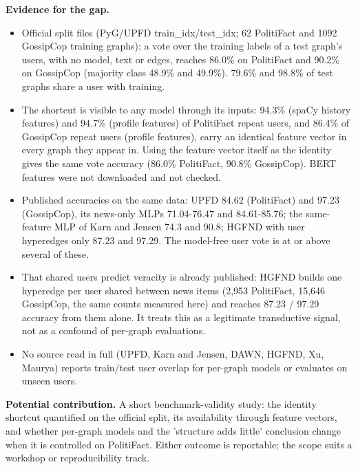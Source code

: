 \documentclass[11pt,a4paper]{article}
\begin{document}
\textbf{Evidence for the gap.}
\begin{itemize}
\item [V] Official split files (PyG/UPFD train\_idx/test\_idx; 62 PolitiFact and 1092 GossipCop training graphs): a vote over the training labels of a test graph's users, with no model, text or edges, reaches 86.0\% on PolitiFact and 90.2\% on GossipCop (majority class 48.9\% and 49.9\%). 79.6\% and 98.8\% of test graphs share a user with training. \cite{dou2021upfd}
\item [V] The shortcut is visible to any model through its inputs: 94.3\% (spaCy history features) and 94.7\% (profile features) of PolitiFact repeat users, and 86.4\% of GossipCop repeat users (profile features), carry an identical feature vector in every graph they appear in. Using the feature vector itself as the identity gives the same vote accuracy (86.0\% PolitiFact, 90.8\% GossipCop). BERT features were not downloaded and not checked. \cite{dou2021upfd}
\item [V] Published accuracies on the same data: UPFD 84.62 (PolitiFact) and 97.23 (GossipCop), its news-only MLPs 71.04-76.47 and 84.61-85.76; the same-feature MLP of Karn and Jensen 74.3 and 90.8; HGFND with user hyperedges only 87.23 and 97.29. The model-free user vote is at or above several of these. \cite{dou2021upfd,karn2025structure,jeong2022hgfnd}
\item [V] That shared users predict veracity is already published: HGFND builds one hyperedge per user shared between news items (2,953 PolitiFact, 15,646 GossipCop, the same counts measured here) and reaches 87.23 / 97.29 accuracy from them alone. It treats this as a legitimate transductive signal, not as a confound of per-graph evaluations. \cite{jeong2022hgfnd}
\item [V] No source read in full (UPFD, Karn and Jensen, DAWN, HGFND, Xu, Maurya) reports train/test user overlap for per-graph models or evaluates on unseen users. \cite{dou2021upfd,karn2025structure,kim2025dawn,jeong2022hgfnd,xu2025topo,maurya2024gnndp}
\end{itemize}

\textbf{Potential contribution.} A short benchmark-validity study: the identity shortcut quantified on the official split, its availability through feature vectors, and whether per-graph models and the 'structure adds little' conclusion change when it is controlled on PolitiFact. Either outcome is reportable; the scope suits a workshop or reproducibility track.
\end{document}
